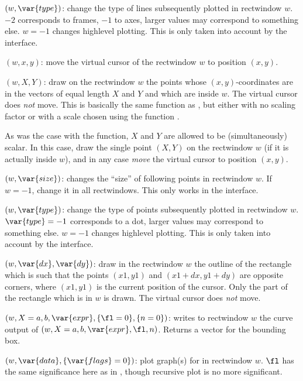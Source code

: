 $(w,\var{type})$: \label{se:plotlinetype}change the type of lines subsequently plotted in rectwindow $w$.
 $-2$ corresponds to frames, $-1$ to axes, larger values may
correspond to something else. $w = -1$ changes highlevel plotting. This is
only taken into account by the  interface.

$(w,x,y)$: \label{se:plotmove}move the virtual cursor of the rectwindow $w$ to position $(x,y)$.

$(w,X,Y)$: \label{se:plotpoints}draw on the rectwindow $w$ the
points whose $(x,y)$-coordinates are in the vectors of equal length $X$ and
$Y$ and which are inside $w$. The virtual cursor does \emph{not} move. This
is basically the same function as , but either with no scaling
factor or with a scale chosen using the function .

As was the case with the  function, $X$ and $Y$ are allowed to
be (simultaneously) scalar. In this case, draw the single point $(X,Y)$ on
the rectwindow $w$ (if it is actually inside $w$), and in any case
\emph{move} the virtual cursor to position $(x,y)$.

$(w,\var{size})$: \label{se:plotpointsize}changes the ``size'' of following points in rectwindow $w$. If $w = -1$,
change it in all rectwindows. This only works in the  interface.

$(w,\var{type})$: \label{se:plotpointtype}change the type of points subsequently plotted in rectwindow $w$.
$\var{type} = -1$ corresponds to a dot, larger values may correspond to
something else. $w = -1$ changes highlevel plotting. This is only taken into
account by the  interface.

$(w,\var{dx},\var{dy})$: \label{se:plotrbox}draw in the rectwindow $w$ the outline of the rectangle which is such
that the points $(x1,y1)$ and $(x1+dx,y1+dy)$ are opposite corners, where
$(x1,y1)$ is the current position of the cursor. Only the part of the
rectangle which is in $w$ is drawn. The virtual cursor does \emph{not} move.

$(w,X=a,b,\var{expr},\{\fl=0\},\{n=0\})$: \label{se:plotrecth}writes to rectwindow $w$ the curve output of
$(w,X=a,b,\var{expr},\fl,n)$. Returns a vector for the bounding box.

$(w,\var{data},\{\var{flags}=0\})$: \label{se:plotrecthraw}plot graph(s) for
 in rectwindow $w$. $\fl$ has the same significance here as in
, though recursive plot is no more significant.

